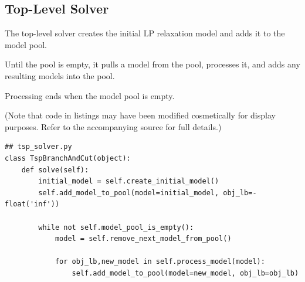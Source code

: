 \documentclass{article}
\begin{document}
\subsection{Top-Level Solver}
\begin{flushleft}

The top-level solver
creates the initial LP relaxation model
and adds it to the model pool.

Until the pool is empty,
it pulls a model from the pool,
processes it,
and adds any resulting models into the pool.

Processing ends when the model pool is empty.

(Note that code in listings may have been modified
cosmetically for display purposes.  Refer to the
accompanying source for full details.)

\begin{lstlisting}
## tsp_solver.py
class TspBranchAndCut(object):
    def solve(self):
        initial_model = self.create_initial_model()
        self.add_model_to_pool(model=initial_model, obj_lb=-float('inf'))

        while not self.model_pool_is_empty():
            model = self.remove_next_model_from_pool()

            for obj_lb,new_model in self.process_model(model):
                self.add_model_to_pool(model=new_model, obj_lb=obj_lb)
\end{lstlisting}

\end{flushleft}
\end{document}
